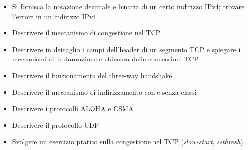 \begin{itemize}
    \item
    Si fornisca la notazione decimale e binaria di un certo indirizzo IPv4; trovare l'errore in un indirizzo IPv4
    
    \item
    Descrivere il meccanismo di congestione nel TCP
    
    \item
    Descrivere in dettaglio i campi dell'header di un segmento TCP e spiegare i meccanismi di instaurazione e chiusura delle connessioni TCP
    
    \item
    Descrivere il funzionamento del three-way handshake
    
    \item
    Descrivere il meccanismo di indirizzamento con e senza classi
    
    \item
    Descrivere i protocolli ALOHA e CSMA
    
    \item
    Descrivere il protocollo UDP
    
    \item
    Svolgere un esercizio pratico sulla congestione nel TCP (\textit{slow-start}, \textit{
ssthresh})
\end{itemize}